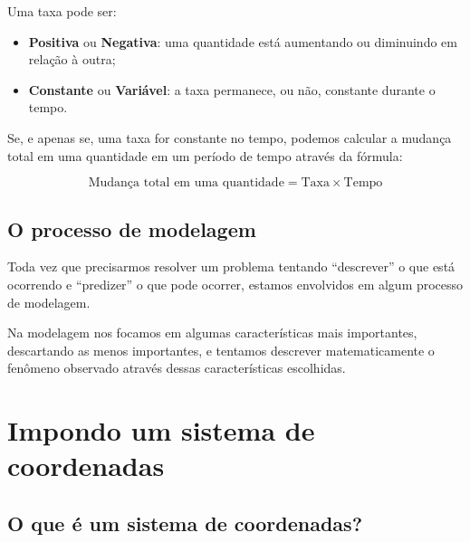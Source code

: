 \documentclass[pdftex, brazil, 12pt, twoside]{article}
\begin{document}
Uma taxa pode ser:
\begin{itemize}
\item \textbf{Positiva} ou \textbf{Negativa}: uma quantidade está aumentando ou diminuindo
  em relação à outra;
\item \textbf{Constante} ou \textbf{Variável}: a taxa permanece, ou não, constante durante
  o tempo.
\end{itemize}

Se, e apenas se, uma taxa for constante no tempo, podemos calcular a mudança total em uma quantidade
em um período de tempo através da fórmula:

\begin{equation}
  \text{Mudança total em uma quantidade} = \text{Taxa} \times \text{Tempo}
\end{equation}

\subsection{O processo de modelagem}
\label{aquecimento-processo-modelagem}

Toda vez que precisarmos resolver um problema tentando ``descrever'' o que está
ocorrendo e ``predizer'' o que pode ocorrer, estamos envolvidos em algum
processo de modelagem.

Na modelagem nos focamos em algumas características mais importantes, descartando
as menos importantes, e tentamos descrever matematicamente o fenômeno observado
através dessas características escolhidas.


\section{Impondo um sistema de coordenadas}
\label{sistema-coordenadas}

\subsection{O que é um sistema de coordenadas?}
\label{sistema-coordenadas-def}
\end{document}
